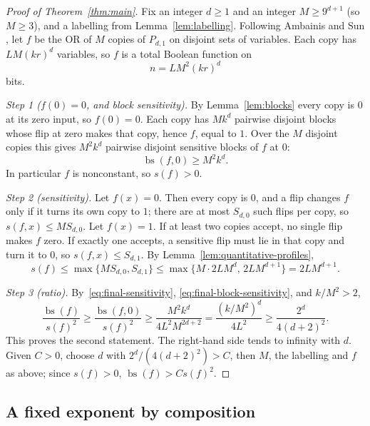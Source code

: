 \documentclass[11pt]{article}
\newcommand{\bs}{\operatorname{bs}}
\theoremstyle{definition}
\theoremstyle{remark}
\begin{document}
\begin{proof}[Proof of Theorem~\ref{thm:main}]
Fix an integer $d\geq1$ and an integer $M\geq9^{d+1}$ (so $M\ge3$), and a
labelling from Lemma~\ref{lem:labelling}. Following Ambainis and Sun
\cite[Section~4, Lemma~1]{AmbainisSun2011}, let $f$ be the OR of $M$ copies of
$P_{d,1}$ on disjoint sets of variables. Each copy has $LM(kr)^d$ variables,
so $f$ is a total Boolean function on
\begin{equation}
\label{eq:final-dimension}
 n=LM^2(kr)^d
\end{equation}
bits.

\emph{Step 1 ($f(0)=0$, and block sensitivity).} By Lemma~\ref{lem:blocks}
every copy is $0$ at its zero input, so $f(0)=0$. Each copy has $Mk^d$
pairwise disjoint blocks whose flip at zero makes that copy, hence $f$, equal
to $1$. Over the $M$ disjoint copies this gives $M^2k^d$ pairwise disjoint
sensitive blocks of $f$ at $0$:
\begin{equation}
\label{eq:final-block-sensitivity}
 \bs(f,0)\geq M^2k^d.
\end{equation}
In particular $f$ is nonconstant, so $s(f)>0$.

\emph{Step 2 (sensitivity).} Let $f(x)=0$. Then every copy is $0$, and a flip
changes $f$ only if it turns its own copy to $1$; there are at most $S_{d,0}$
such flips per copy, so $s(f,x)\le MS_{d,0}$. Let $f(x)=1$. If at least two
copies accept, no single flip makes $f$ zero. If exactly one accepts, a
sensitive flip must lie in that copy and turn it to $0$, so
$s(f,x)\le S_{d,1}$. By Lemma~\ref{lem:quantitative-profiles},
\begin{equation}
\label{eq:final-sensitivity}
 s(f)\leq\max\{M S_{d,0},S_{d,1}\}
       \leq\max\{M\cdot2LM^d,\,2LM^{d+1}\}=2L M^{d+1}.
\end{equation}

\emph{Step 3 (ratio).} By~\eqref{eq:final-sensitivity},
\eqref{eq:final-block-sensitivity}, and $k/M^2>2$,
\begin{equation}
\label{eq:ratio-separation}
 \frac{\bs(f)}{s(f)^2}
 \geq\frac{\bs(f,0)}{s(f)^2}
 \geq\frac{M^2k^d}{4L^2M^{2d+2}}
 =\frac{(k/M^2)^d}{4L^2}
 \geq\frac{2^d}{4(d+2)^2}.
\end{equation}
This proves the second statement. The right-hand side tends to infinity with
$d$. Given $C>0$, choose $d$ with $2^d/(4(d+2)^2)>C$, then $M$, the labelling
and $f$ as above; since $s(f)>0$, $\bs(f)>C s(f)^2$.
\end{proof}

\subsection{A fixed exponent by composition}
\end{document}
